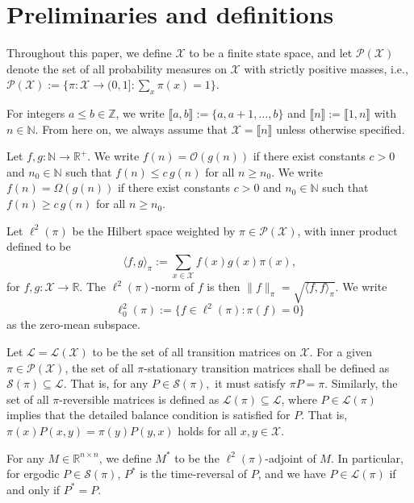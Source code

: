 \documentclass[EJP]{ejpecp} %
\begin{document}
\section{Preliminaries and definitions}\label{sec:prelim}
Throughout this paper, we define $\mathcal{X}$ to be a finite state space, and let $\mathcal{P}(\mathcal{X})$ denote the set of all probability measures on $\mathcal{X}$ with strictly positive masses, i.e., $\mathcal{P}(\mathcal{X}) := \{ \pi : \mathcal{X} \to (0,1] : \sum_x \pi(x)=1 \}$.

For integers $a \leq b \in \mathbb{Z}$, we write $\llbracket a,b \rrbracket := \{a, a+1, \ldots, b\}$ and $\llbracket n \rrbracket := \llbracket 1,n \rrbracket$ with $n \in \mathbb{N}$. From here on, we always assume that $\mathcal{X} = \llbracket n \rrbracket$ unless otherwise specified. 

Let $f,g:\mathbb{N}\to\mathbb{R}^+$. We write $f(n)=\mathcal{O}(g(n))$ if there exist constants $c>0$ and $n_0\in\mathbb{N}$ such that $f(n)\le c\,g(n)$ for all $n\ge n_0$. We write $f(n)=\Omega(g(n))$ if there exist constants $c>0$ and $n_0\in\mathbb{N}$ such that $f(n)\ge c\,g(n)$ for all $n\ge n_0$.

Let $\ell^2(\pi)$ be the Hilbert space weighted by $\pi \in \mathcal{P}(\mathcal{X})$, with inner product defined to be 
$$\langle f,g \rangle_\pi := \sum_{x\in \mathcal{X}} f(x)g(x)\pi(x),$$
for $f,g: \mathcal{X} \to \mathbb{R}$. The $\ell^2(\pi)$-norm of $f$ is then $\|f\|_\pi = \sqrt{\langle f,f \rangle_\pi}$. We write 
$$\ell^2_0(\pi) := \{f \in \ell^2(\pi): \pi(f) = 0\}$$
as the zero-mean subspace.

Let $\mathcal{L} = \mathcal{L}(\mathcal{X})$ to be the set of all transition matrices on $\mathcal{X}$. For a given $\pi \in \mathcal{P}(\mathcal{X})$, the set of all $\pi$-stationary transition matrices shall be defined as $\mathcal{S}(\pi) \subseteq \mathcal{L}$. That is, for any $P \in \mathcal{S}(\pi),$ it must satisfy $\pi P = \pi$. Similarly, the set of all $\pi$-reversible matrices is defined as $\mathcal{L}(\pi) \subseteq \mathcal{L}$, where $P \in \mathcal{L}(\pi)$ implies that the detailed balance condition is satisfied for $P$. That is, $\pi(x) P(x,y) = \pi(y) P(y,x)$ holds for all $x,y \in \mathcal{X}$. 

For any $M \in \mathbb{R}^{n \times n}$, we define $M^*$ to be the $\ell^2(\pi)$-adjoint of $M$. In particular, for ergodic $P\in \mathcal{S}(\pi)$, $P^*$ is the time-reversal of $P$, and we have $P\in \mathcal{L}(\pi)$ if and only if $P^* = P$.
\end{document}
